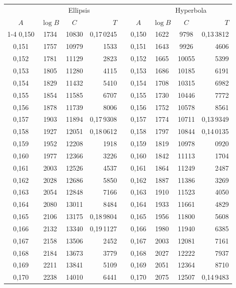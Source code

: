 \begin{tabular}{|c|c|c|r|@{}p{9pt}@{}|c|c|c|r|}
\hline
 & \multicolumn{3}{c|}{Ellipsis} & & & \multicolumn{3}{c|}{Hyperbola} \\
\(A\) & \(\log B\) & \(C\) & \(T\) & & \(A\) & \(\log B\) & \(C\) & \(T\) \\
\cline{1-4}\cline{6-9}
0,150 & 1734 & 10830 & 0,17\,0245 &  & 0,150 & 1622 & 9798 & 0,13\,3812 \\
0,151 & 1757 & 10979 & 1533 &  & 0,151 & 1643 & 9926 & 4606 \\
0,152 & 1781 & 11129 & 2823 &  & 0,152 & 1665 & 10055 & 5399 \\
0,153 & 1805 & 11280 & 4115 &  & 0,153 & 1686 & 10185 & 6191 \\
0,154 & 1829 & 11432 & 5410 &  & 0,154 & 1708 & 10315 & 6982 \\
0,155 & 1854 & 11585 & 6707 &  & 0,155 & 1730 & 10446 & 7772 \\[3pt]
0,156 & 1878 & 11739 & 8006 &  & 0,156 & 1752 & 10578 & 8561 \\
0,157 & 1903 & 11894 & 0,17\,9308 &  & 0,157 & 1774 & 10711 & 0,13\,9349 \\
0,158 & 1927 & 12051 & 0,18\,0612 &  & 0,158 & 1797 & 10844 & 0,14\,0135 \\
0,159 & 1952 & 12208 & 1918 &  & 0,159 & 1819 & 10978 & 0920 \\
0,160 & 1977 & 12366 & 3226 &  & 0,160 & 1842 & 11113 & 1704 \\[3pt]
0,161 & 2003 & 12526 & 4537 &  & 0,161 & 1864 & 11249 & 2487 \\
0,162 & 2028 & 12686 & 5850 &  & 0,162 & 1887 & 11386 & 3269 \\
0,163 & 2054 & 12848 & 7166 &  & 0,163 & 1910 & 11523 & 4050 \\
0,164 & 2080 & 13011 & 8484 &  & 0,164 & 1933 & 11661 & 4829 \\
0,165 & 2106 & 13175 & 0,18\,9804 &  & 0,165 & 1956 & 11800 & 5608 \\[3pt]
0,166 & 2132 & 13340 & 0,19\,1127 &  & 0,166 & 1980 & 11940 & 6385 \\
0,167 & 2158 & 13506 & 2452 &  & 0,167 & 2003 & 12081 & 7161 \\
0,168 & 2184 & 13673 & 3779 &  & 0,168 & 2027 & 12222 & 7937 \\
0,169 & 2211 & 13841 & 5109 &  & 0,169 & 2051 & 12364 & 8710 \\
0,170 & 2238 & 14010 & 6441 &  & 0,170 & 2075 & 12507 & 0,14\,9483 \\[3pt]

\end{tabular}
